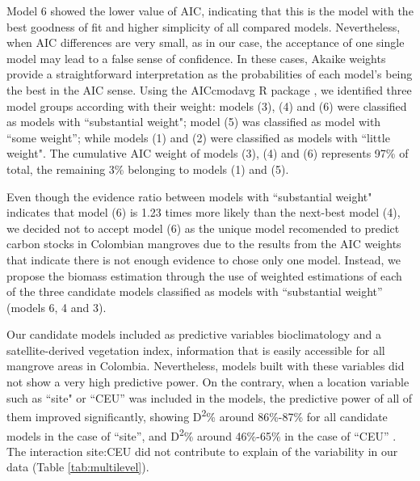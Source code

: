 \documentclass[review, authoryear]{elsarticle}   	%
\begin{document}
Model 6 showed the lower value of AIC, indicating that this is the model with the best goodness of fit and higher simplicity of all compared models. Nevertheless, when AIC differences are very small, as in our case, the acceptance of one single model may lead to a false sense of confidence. In these cases, Akaike weights provide a straightforward interpretation as the probabilities of each model's being the best in the AIC sense. Using the AICcmodavg R package \citep{Mazerolle:2015aa}, we identified three model groups according with their weight: models (3), (4) and (6) were classified as models with ``substantial weight"; model (5) was classified as model with ``some weight''; while models (1) and (2) were classified  as models with ``little weight". The cumulative AIC weight of models (3), (4) and (6) represents 97\% of total, the remaining 3\% belonging to models (1) and (5). 

Even though the evidence ratio between models with ``substantial weight" indicates that model (6) is 1.23 times more likely than  the next-best model (4), we decided not to accept model (6) as the unique model recomended to predict carbon stocks in Colombian mangroves due to  the results from the AIC weights that indicate there is not enough evidence to chose only one model. Instead, we propose the biomass estimation through the use of weighted estimations of each of the three candidate models classified as models with ``substantial weight'' (models 6, 4 and 3).

Our candidate models included as predictive variables bioclimatology and a satellite-derived vegetation index, information that is easily accessible for all mangrove areas in Colombia. Nevertheless, models built with these variables did not show a very high predictive power. On the contrary, when a location variable such as ``site" or ``CEU'' was included in the models, the predictive power of all of them improved significantly, showing D\textsuperscript{2}\% around 86\%-87\% for all candidate models in the case of ``site'', and D\textsuperscript{2}\% around 46\%-65\%  in the case of ``CEU'' . The interaction site:CEU  did not contribute to explain of the variability in our data (Table \ref{tab:multilevel}).
\end{document}
